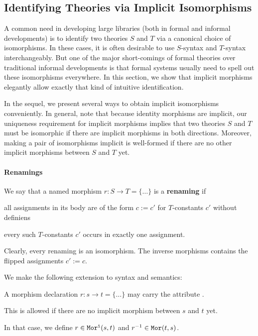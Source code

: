 \subsection{Identifying Theories via Implicit Isomorphisms}\label{sec:inverse}

A common need in developing large libraries (both in formal and informal developments) is to identify two theories $S$ and $T$ via a canonical choice of isomorphisms.
In these cases, it is often desirable to use $S$-syntax and $T$-syntax interchangeably.
But one of the major short-comings of formal theories over traditional informal developments is that formal systems usually need to spell out these isomorphisms everywhere.
In this section, we show that implicit morphisms elegantly allow exactly that kind of intuitive identification.

In the sequel, we present several ways to obtain implicit isomorphisms conveniently.
In general, note that because identity morphisms are implicit, our uniqueness requirement for implicit morphisms implies that two theories $S$ and $T$ must be isomorphic if there are implicit morphisms in both directions.
Moreover, making a pair of isomorphisms implicit is well-formed if there are no other implicit morphisms between $S$ and $T$ yet.

\paragraph{Renamings}
We say that a named morphism $r:S\to T=\{\ldots\}$ is a \textbf{renaming} if
\begin{compactitem}
 \item all assignments in its body are of the form $c:=c'$ for $T$-constants $c'$ without definiens
 \item every such $T$-constants $c'$ occurs in exactly one assignment.
\end{compactitem}
Clearly, every renaming is an isomorphism.
The inverse morphisms contains the flipped assignments $c':=c$.

We make the following extension to syntax and semantics:
\begin{compactitem}
  \item A morphism declaration $r:s\to t=\{\ldots\}$ may carry the attribute .
  \item This is allowed if there are no implicit morphism between $s$ and $t$ yet.
  \item In that case, we define $r\in\mathtt{Mor^i}(s,t)$ and $r^{-1}\in\mathtt{Mor}(t,s)$.
\end{compactitem}

